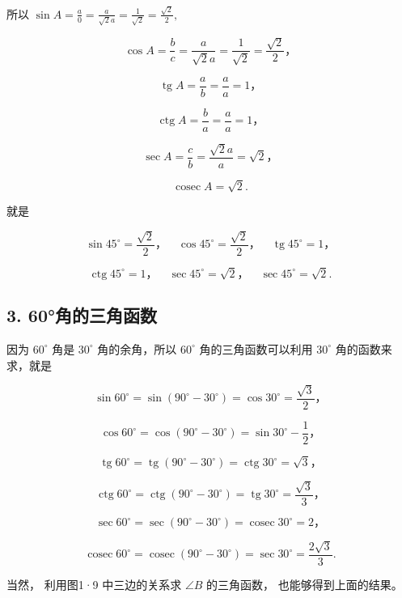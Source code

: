 所以
\(\sin A = \frac{a}{0} = \frac{a}{\sqrt{2}a} = \frac{1}{\sqrt{2}} = \frac{\sqrt{2}}{2},\)

\[
\cos A = \frac {b}{c} = \frac {a}{\sqrt {2} a} = \frac {1}{\sqrt {2}} = \frac {\sqrt {2}}{2}\text{，}
\]

\[
\operatorname{tg} A = \frac {a}{b} = \frac {a}{a} = 1\text{，}
\]

\[
\operatorname{ctg} A = \frac {b}{a} = \frac {a}{a} = 1\text{，}
\]

\[
\sec A = \frac {c}{b} = \frac {\sqrt {2} a}{a} = \sqrt {2}\text{，}
\]

\[
\operatorname{cosec}A=\sqrt2.
\]

就是

\[
\sin 45 ^{\circ} = \frac {\sqrt {2}}{2}\text{，} \quad \cos 45 ^{\circ} = \frac {\sqrt {2}}{2}\text{，} \quad \operatorname{tg} 45 ^{\circ} = 1\text{，}
\]

\[
\operatorname{ctg} 45 ^{\circ} = 1\text{，} \quad \sec 45 ^{\circ} = \sqrt {2}\text{，} \quad \sec 45 ^{\circ} = \sqrt {2}.
\]

\subsection{3. 60°角的三角函数}

因为 \(60^{\circ}\) 角是 \(30^{\circ}\) 角的余角，所以 \(60^{\circ}\)
角的三角函数可以利用 \(30^{\circ}\) 角的函数来求，就是

\[
\sin 60 ^{\circ} = \sin (90 ^{\circ} - 30 ^{\circ}) = \cos 30 ^{\circ} = \frac {\sqrt {3}}{2}\text{，}
\]

\[
\cos 60 ^{\circ} = \cos (90 ^{\circ} - 30 ^{\circ}) = \sin 30 ^{\circ} - \frac {1}{2}\text{，}
\]

\[
\operatorname{tg} 60 ^{\circ} = \operatorname{tg} (90 ^{\circ} - 30 ^{\circ}) = \operatorname{ctg} 30 ^{\circ} = \sqrt {3}\text{，}
\]

\[
\operatorname{ctg} 60 ^{\circ} = \operatorname{ctg} (90 ^{\circ} - 30 ^{\circ}) = \operatorname{tg} 30 ^{\circ} = \frac {\sqrt {3}}{3}\text{，}
\]

\[
\sec 60 ^{\circ} = \sec (90 ^{\circ} - 30 ^{\circ}) = \operatorname{cosec} 30 ^{\circ} = 2\text{，}
\]

\[
\operatorname{cosec} 60 ^{\circ} = \operatorname{cosec} (90 ^{\circ} - 30 ^{\circ}) = \sec 30 ^{\circ} = \frac {2 \sqrt {3}}{3}.
\]

当然， 利用图1·9 中三边的关系求 \(\angle B\) 的三角函数，
也能够得到上面的结果。

